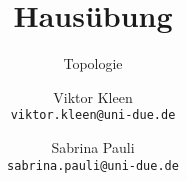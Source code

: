 \title{Hausübung \theSheet}
\subtitle{Topologie}
\author{\normalsize Viktor Kleen \\[-1ex] \texttt{\footnotesize viktor.kleen@uni-due.de} %
   \and \normalsize Sabrina Pauli \\[-1ex] \texttt{\footnotesize sabrina.pauli@uni-due.de}}
\date{}

\newenvironment{identity}{}{}

